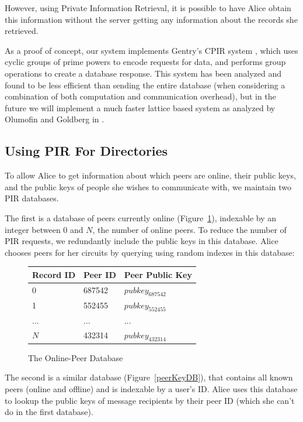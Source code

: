 \documentclass[twocolumn,11pt,english]{article}
\begin{document}
However, using Private Information Retrieval, it is possible to have Alice obtain this information without the server getting any information about the records she retrieved. 

As a proof of concept, our system implements Gentry's CPIR system \cite{singledatabaseprivate}, which uses cyclic groups of prime powers to encode requests for data, and performs group operations to create a database response. This system has been analyzed and found to be less efficient than sending the entire database \cite{practicalPIR}(when considering a combination of both computation and communication overhead), but in the future we will implement a much faster lattice based system as analyzed by Olumofin and Goldberg in \cite{practicalPIR}.

\subsection{Using PIR For Directories}
\label{sec:PIRDirectories}
To allow Alice to get information about which peers are online, their public keys, and the public keys of people she wishes to communicate with, we maintain two PIR databases.

The first is a database of peers currently online (Figure~\ref{onlinePeerDB}), indexable by an integer between 0 and $N$, the number of online peers. To reduce the number of PIR requests, we redundantly include the public keys in this database. Alice chooses peers for her circuits by querying using random indexes in this database:

\begin{figure}[ht]
  \centering
\begin{tabular}{| l | l | l |}
  \hline
  Record ID & Peer ID & Peer Public Key \\ \hline
  0 & 687542 & $pubkey_{687542}$  \\ \hline
  1 & 552455 & $pubkey_{552455}$  \\ \hline
  ... & ... & $...$  \\ \hline
  $N$ & 432314 & $pubkey_{432314}$  \\ \hline
\end{tabular}
\caption{The Online-Peer Database}
\label{onlinePeerDB}
\end{figure}

The second is a similar database (Figure~\ref{peerKeyDB}), that contains all known peers (online and offline) and is indexable by a user's ID. Alice uses this database to lookup the public keys of message recipients by their peer ID (which she can't do in the first database). 
\end{document}
